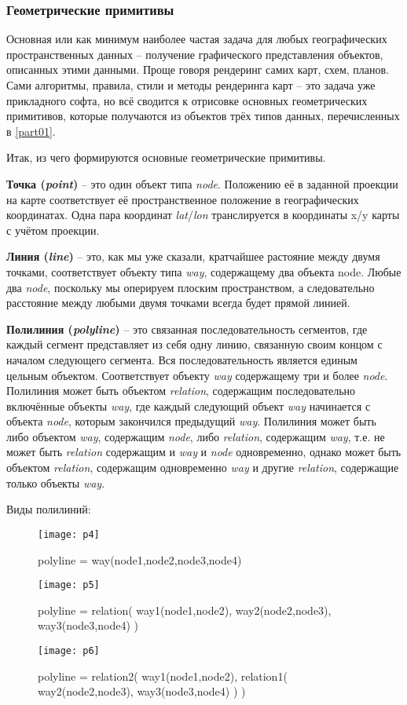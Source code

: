 \subsubsection{Геометрические примитивы}
Основная или как минимум наиболее частая задача для любых географических 
пространственных данных -- получение графического представления объектов, 
описанных этими данными. Проще говоря рендеринг самих карт, схем, планов. Сами 
алгоритмы, правила, стили и методы рендеринга карт -- это задача уже 
прикладного софта, но всё сводится к отрисовке основных геометрических 
примитивов, которые получаются из объектов трёх типов данных, перечисленных в 
\ref{part01}.

Итак, из чего формируются основные геометрические примитивы.

\textbf{Точка (\emph{point})} -- это один объект типа \emph{node}. Положению 
её в заданной проекции на карте соответствует её пространственное положение в 
географических координатах. Одна пара координат \emph{lat}/\emph{lon} 
транслируется в координаты x/y карты с учётом проекции.

\textbf{Линия (\emph{line})} -- это, как мы уже сказали, кратчайшее растояние 
между двумя точками, соответствует объекту типа \emph{way}, содержащему два 
объекта node. Любые два \emph{node}, поскольку мы оперируем плоским 
пространством, а следовательно расстояние между любыми двумя точками всегда 
будет прямой линией.

\textbf{Полилиния (\emph{polyline})} -- это связанная последовательность 
сегментов, где каждый сегмент представляет из себя одну линию, связанную своим 
концом с началом следующего сегмента. Вся последовательность является единым 
цельным объектом. Соответствует объекту \emph{way} содержащему три и более 
\emph{node}. Полилиния может быть объектом \emph{relation}, содержащим 
последовательно включённые объекты \emph{way}, где каждый следующий объект 
\emph{way} начинается с объекта \emph{node}, которым закончился предыдущий 
\emph{way}. Полилиния может быть либо объектом \emph{way}, содержащим 
\emph{node}, либо \emph{relation}, содержащим \emph{way}, т.е. не может быть 
\emph{relation} содержащим и \emph{way} и \emph{node} одновременно, однако 
может быть объектом \emph{relation}, содержащим одновременно \emph{way} и 
другие \emph{relation}, содержащие только объекты \emph{way}.

Виды полилиний:

\begin{figure}[ht!]
    \center
    \texttt{[image: p4]}
    \caption{polyline = way(node1,node2,node3,node4)}
    \texttt{[image: p5]}
    \caption{polyline = relation( way1(node1,node2), 
        way2(node2,node3), way3(node3,node4) )}
    \texttt{[image: p6]}
    \caption{polyline = relation2( way1(node1,node2), 
        relation1( way2(node2,node3), way3(node3,node4) ) )}
\end{figure}

